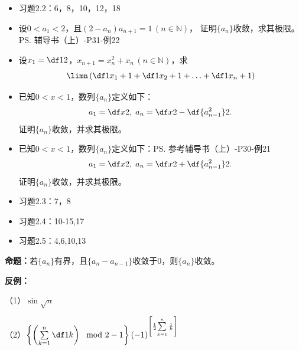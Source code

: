 \begin{itemize}
  \item 习题2.2：6，8，10，12，18
  \item 设$0<a_1<2$，且$(2-a_n)a_{n+1}=1\,(n\in\mathbb{N})$，
  	证明$\{a_n\}$收敛，求其极限。\ps{辅导书（上）-P31-例22}\\
  \item 设$x_1=\df 12$，$x_{n+1}=x_n^2+x_n\,(n\in\mathbb{N})$，求
	$$\limn\left(\df 1{x_1+1}+\df 1{x_2+1}+\ldots+\df
	1{x_n+1}\right)$$
  \item 已知$0<x<1$，数列$\{a_n\}$定义如下：
	$$a_1=\df x2,\;a_n=\df x2-\df{a_{n-1}^2}2.$$
	证明$\{a_n\}$收敛，并求其极限。
  \item 已知$0<x<1$，数列$\{a_n\}$定义如下：\ps{参考辅导书（上）-P30-例21}
	$$a_1=\df x2,\;a_n=\df x2+\df{a_{n-1}^2}2.$$
	证明$\{a_n\}$收敛，并求其极限。
  \item 习题2.3：7，8 
  \item 习题2.4：10-15,17
  \item 习题2.5：4,6,10,13
\end{itemize}
% 
% 

\newpage

{\bf 命题：}若$\{a_n\}$有界，且$\{a_n-a_{n-1}\}$收敛于$0$，则$\{a_n\}$收敛。

{\bf 反例：}

（1）$\sin\sqrt n$

（2）$\left\{\left(\sum\limits_{k=1}^n\df1k\right)\mod
2-1\right\}(-1)^{\left[\frac12{\sum\limits_{k=1}^n\frac1k}\right]}$

